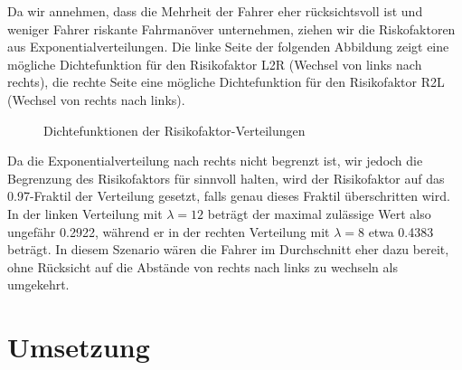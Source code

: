 \documentclass[10pt, a4paper]{article}
\begin{document}
Da wir annehmen, dass die Mehrheit der Fahrer eher rücksichtsvoll ist und weniger Fahrer riskante Fahrmanöver unternehmen, ziehen wir die Riskofaktoren aus Exponentialverteilungen. Die linke Seite der folgenden Abbildung zeigt eine mögliche Dichtefunktion für den Risikofaktor L2R (Wechsel von links nach rechts), die rechte Seite eine mögliche Dichtefunktion für den Risikofaktor R2L (Wechsel von rechts nach links).

\begin{figure}[h!]
    \centering
    \caption{Dichtefunktionen der Risikofaktor-Verteilungen}
    \label{fig:riskFactorDistributions}
\end{figure}

Da die Exponentialverteilung nach rechts nicht begrenzt ist, wir jedoch die Begrenzung des Risikofaktors für sinnvoll halten, wird der Risikofaktor auf das 0.97-Fraktil der Verteilung gesetzt, falls genau dieses Fraktil überschritten wird. In der linken Verteilung mit $\lambda = 12$ beträgt der maximal zulässige Wert also ungefähr 0.2922, während er in der rechten Verteilung mit $\lambda = 8$ etwa 0.4383 beträgt. In diesem Szenario wären die Fahrer im Durchschnitt eher dazu bereit, ohne Rücksicht auf die Abstände von rechts nach links zu wechseln als umgekehrt.

\section{Umsetzung}
\label{sec:umsetzung}
\end{document}
